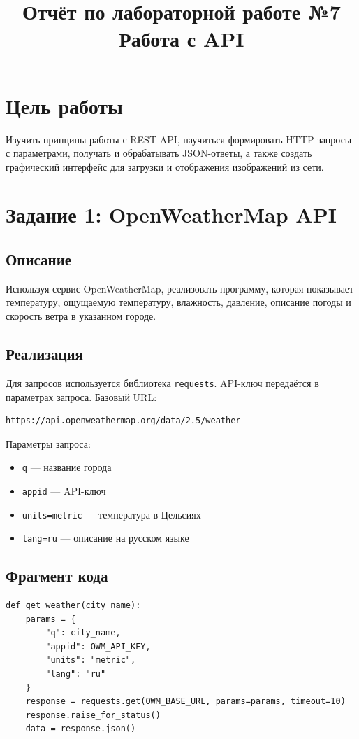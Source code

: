 \documentclass[12pt,a4paper]{article}
\title{\textbf{Отчёт по лабораторной работе №7} \\ \large Работа с API}
\author{}
\date{}
\begin{document}
\maketitle
\thispagestyle{empty}

\section*{Цель работы}
Изучить принципы работы с REST API, научиться формировать HTTP-запросы с параметрами, получать и обрабатывать JSON-ответы, а также создать графический интерфейс для загрузки и отображения изображений из сети.

\section*{Задание 1: OpenWeatherMap API}
\subsection*{Описание}
Используя сервис OpenWeatherMap, реализовать программу, которая показывает температуру, ощущаемую температуру, влажность, давление, описание погоды и скорость ветра в указанном городе.

\subsection*{Реализация}
Для запросов используется библиотека \texttt{requests}. API-ключ передаётся в параметрах запроса. Базовый URL:
\begin{lstlisting}
https://api.openweathermap.org/data/2.5/weather
\end{lstlisting}

Параметры запроса:
\begin{itemize}
    \item \texttt{q} --- название города
    \item \texttt{appid} --- API-ключ
    \item \texttt{units=metric} --- температура в Цельсиях
    \item \texttt{lang=ru} --- описание на русском языке
\end{itemize}

\subsection*{Фрагмент кода}
\begin{lstlisting}
def get_weather(city_name):
    params = {
        "q": city_name,
        "appid": OWM_API_KEY,
        "units": "metric",
        "lang": "ru"
    }
    response = requests.get(OWM_BASE_URL, params=params, timeout=10)
    response.raise_for_status()
    data = response.json()
\end{lstlisting}
\end{document}
